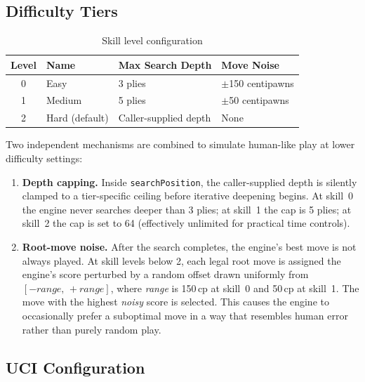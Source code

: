 \documentclass[11pt,a4paper]{report}
\begin{document}
\subsection{Difficulty Tiers}

\begin{table}[h]
\centering
\begin{tabular}{clll}
\toprule
\textbf{Level} & \textbf{Name}   & \textbf{Max Search Depth} & \textbf{Move Noise} \\
\midrule
0              & Easy            & 3 plies                   & $\pm$150 centipawns \\
1              & Medium          & 5 plies                   & $\pm$50 centipawns  \\
2              & Hard (default)  & Caller-supplied depth      & None                \\
\bottomrule
\end{tabular}
\caption{Skill level configuration}
\end{table}

Two independent mechanisms are combined to simulate human-like play at lower
difficulty settings:

\begin{enumerate}
    \item \textbf{Depth capping.} Inside \texttt{searchPosition}, the
    caller-supplied depth is silently clamped to a tier-specific ceiling before
    iterative deepening begins. At skill~0 the engine never searches deeper than
    3 plies; at skill~1 the cap is 5 plies; at skill~2 the cap is set to 64
    (effectively unlimited for practical time controls).

    \item \textbf{Root-move noise.} After the search completes, the engine's
    best move is not always played. At skill levels below 2, each legal root
    move is assigned the engine's score perturbed by a random offset drawn
    uniformly from $[-\textit{range},\, +\textit{range}]$, where
    \textit{range} is 150\,cp at skill~0 and 50\,cp at skill~1. The move with
    the highest \emph{noisy} score is selected. This causes the engine to
    occasionally prefer a suboptimal move in a way that resembles human error
    rather than purely random play.
\end{enumerate}

\subsection{UCI Configuration}
\end{document}
